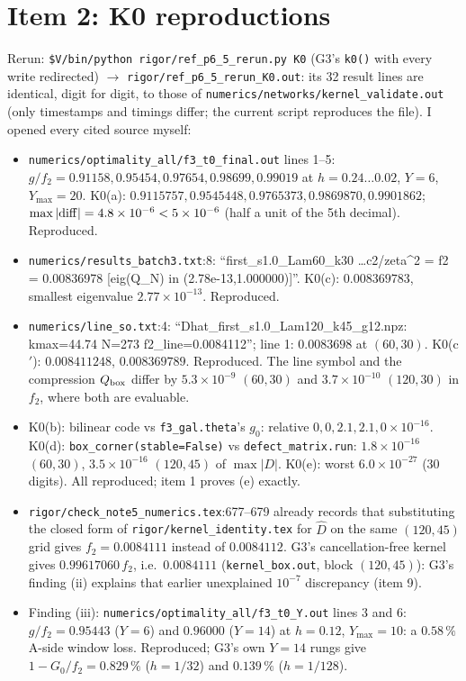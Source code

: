 \documentclass[11pt]{article}
\begin{document}
\section{Item 2: K0 reproductions}
Rerun: \texttt{\$V/bin/python rigor/ref\_p6\_5\_rerun.py K0} (G3's \texttt{k0()} with every write redirected) $\to$
\texttt{rigor/ref\_p6\_5\_rerun\_K0.out}: its 32 result lines are identical, digit for digit, to those of
\texttt{numerics/networks/kernel\_validate.out} (only timestamps and timings differ; the current script reproduces the
file). I opened every cited source myself:
\begin{itemize}[leftmargin=*]
\item \texttt{numerics/optimality\_all/f3\_t0\_final.out} lines 1--5: $g/f_2=0.91158, 0.95454, 0.97654, 0.98699, 0.99019$ at
$h=0.24\ldots0.02$, $Y=6$, $Y_{\max}=20$. K0(a): $0.9115757, 0.9545448, 0.9765373, 0.9869870, 0.9901862$; $\max|{\rm diff}|
=4.8\times10^{-6}<5\times10^{-6}$ (half a unit of the 5th decimal). Reproduced.
\item \texttt{numerics/results\_batch3.txt}:8: ``first\_s1.0\_Lam60\_k30 \ldots c2/zeta\^{}2 = f2 = 0.00836978 [eig(Q\_N) in
(2.78e-13,1.000000)]''. K0(c): $0.008369783$, smallest eigenvalue $2.77\times10^{-13}$. Reproduced.
\item \texttt{numerics/line\_so.txt}:4: ``Dhat\_first\_s1.0\_Lam120\_k45\_g12.npz: kmax=44.74 N=273 f2\_line=0.0084112''; line 1:
$0.0083698$ at $(60,30)$. K0(c$'$): $0.008411248$, $0.008369789$. Reproduced. The line symbol and the compression
$Q_{\rm box}$ differ by $5.3\times10^{-9}$ $(60,30)$ and $3.7\times10^{-10}$ $(120,30)$ in $f_2$, where both are evaluable.
\item K0(b): bilinear code vs \texttt{f3\_gal.theta}'s $g_0$: relative $0, 0, 2.1, 2.1, 0\times10^{-16}$. K0(d):
\texttt{box\_corner(stable=False)} vs \texttt{defect\_matrix.run}: $1.8\times10^{-16}$ $(60,30)$, $3.5\times10^{-16}$ $(120,45)$
of $\max|D|$. K0(e): worst $6.0\times10^{-27}$ (30 digits). All reproduced; item 1 proves (e) exactly.
\item \texttt{rigor/check\_note5\_numerics.tex}:677--679 already records that substituting the closed form of
\texttt{rigor/kernel\_identity.tex} for $\hat D$ on the same $(120,45)$ grid gives $f_2=0.0084111$ instead of
$0.0084112$. G3's cancellation-free kernel gives $0.99617060\,f_2$, i.e.\ $0.0084111$ (\texttt{kernel\_box.out}, block
$(120,45)$): G3's finding (ii) explains that earlier unexplained $10^{-7}$ discrepancy (item 9).
\item Finding (iii): \texttt{numerics/optimality\_all/f3\_t0\_Y.out} lines 3 and 6: $g/f_2=0.95443$ ($Y=6$) and
$0.96000$ ($Y=14$) at $h=0.12$, $Y_{\max}=10$: a $0.58\,\%$ A-side window loss. Reproduced; G3's own $Y=14$ rungs give
$1-G_0/f_2=0.829\,\%$ ($h=1/32$) and $0.139\,\%$ ($h=1/128$).
\end{itemize}
\end{document}
